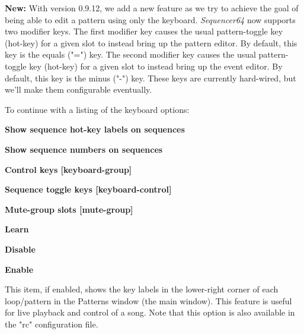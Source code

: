 
   \textbf{New:}
   With version 0.9.12, we add a new feature as we try to achieve the goal of
   being able to edit a pattern using only the keyboard.
   \textsl{Sequencer64} now supports two modifier keys.
   The first modifier key causes the usual pattern-toggle key (hot-key) for a
   given slot to instead bring up the pattern editor.  By default, this key is
   the equals ("=") key.  The second modifier key causes the usual
   pattern-toggle key (hot-key) for a given slot to instead bring up the event
   editor.  By default, this key is the minus ("-") key.
   These keys are currently hard-wired, but we'll make them configurable
   eventually.

   To continue with a listing of the keyboard options:

   \begin{enumber}
      \item \textbf{Show sequence hot-key labels on sequences}
      \item \textbf{Show sequence numbers on sequences}
      \item \textbf{Control keys [keyboard-group]}
      \item \textbf{Sequence toggle keys [keyboard-control]}
      \item \textbf{Mute-group slots [mute-group]}
      \item \textbf{Learn}
      \item \textbf{Disable}
      \item \textbf{Enable}
   \end{enumber}

   \setcounter{ItemCounter}{0}      %

   This item, if enabled, shows the key labels in the lower-right corner of
   each loop/pattern in the Patterns window (the main window).  This feature is
   useful for live playback and control of a song.
   Note that this option is also available in the "rc" configuration file.

